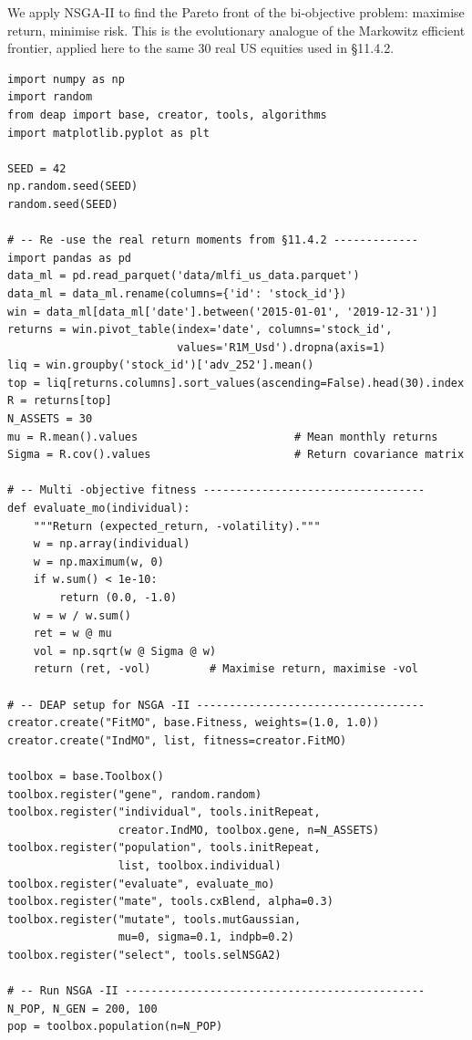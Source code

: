 We apply NSGA-II to find the Pareto front of the bi-objective problem: maximise return, minimise risk. This is the evolutionary analogue of the Markowitz efficient frontier, applied here to the same 30 real US equities used in §11.4.2.

\begin{verbatim}
import numpy as np
import random
from deap import base, creator, tools, algorithms
import matplotlib.pyplot as plt

SEED = 42
np.random.seed(SEED)
random.seed(SEED)

# -- Re -use the real return moments from §11.4.2 -------------
import pandas as pd
data_ml = pd.read_parquet('data/mlfi_us_data.parquet')
data_ml = data_ml.rename(columns={'id': 'stock_id'})
win = data_ml[data_ml['date'].between('2015-01-01', '2019-12-31')]
returns = win.pivot_table(index='date', columns='stock_id',
                          values='R1M_Usd').dropna(axis=1)
liq = win.groupby('stock_id')['adv_252'].mean()
top = liq[returns.columns].sort_values(ascending=False).head(30).index
R = returns[top]
N_ASSETS = 30
mu = R.mean().values                        # Mean monthly returns
Sigma = R.cov().values                      # Return covariance matrix

# -- Multi -objective fitness ----------------------------------
def evaluate_mo(individual):
    """Return (expected_return, -volatility)."""
    w = np.array(individual)
    w = np.maximum(w, 0)
    if w.sum() < 1e-10:
        return (0.0, -1.0)
    w = w / w.sum()
    ret = w @ mu
    vol = np.sqrt(w @ Sigma @ w)
    return (ret, -vol)         # Maximise return, maximise -vol

# -- DEAP setup for NSGA -II -----------------------------------
creator.create("FitMO", base.Fitness, weights=(1.0, 1.0))
creator.create("IndMO", list, fitness=creator.FitMO)

toolbox = base.Toolbox()
toolbox.register("gene", random.random)
toolbox.register("individual", tools.initRepeat,
                 creator.IndMO, toolbox.gene, n=N_ASSETS)
toolbox.register("population", tools.initRepeat,
                 list, toolbox.individual)
toolbox.register("evaluate", evaluate_mo)
toolbox.register("mate", tools.cxBlend, alpha=0.3)
toolbox.register("mutate", tools.mutGaussian,
                 mu=0, sigma=0.1, indpb=0.2)
toolbox.register("select", tools.selNSGA2)

# -- Run NSGA -II ----------------------------------------------
N_POP, N_GEN = 200, 100
pop = toolbox.population(n=N_POP)


\end{verbatim}
